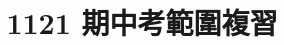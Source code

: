 \documentclass[12pt]{extarticle}
\theoremstyle{definition}
\begin{document}
\title{\texorpdfstring{\vspace{-16mm} 1121 期中考範圍複習}{1121 期中考範圍複習}} 
\author{\vspace{-5em}}
\date{\vspace{-5em}}
\maketitle
\end{document}
